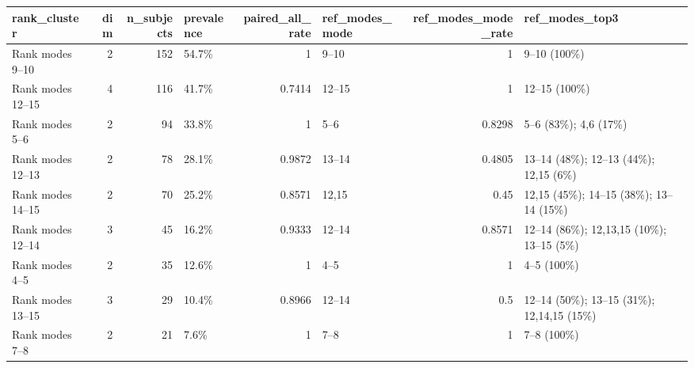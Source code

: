 \begin{tabular}{lrrlrlrl}
\toprule
rank\_cluster & dim & n\_subjects & prevalence & paired\_all\_rate & ref\_modes\_mode & ref\_modes\_mode\_rate & ref\_modes\_top3 \\
\midrule
Rank modes 9--10 & 2 & 152 & 54.7\% & 1 & 9--10 & 1 & 9--10 (100\%) \\
Rank modes 12--15 & 4 & 116 & 41.7\% & 0.7414 & 12--15 & 1 & 12--15 (100\%) \\
Rank modes 5--6 & 2 & 94 & 33.8\% & 1 & 5--6 & 0.8298 & 5--6 (83\%); 4,6 (17\%) \\
Rank modes 12--13 & 2 & 78 & 28.1\% & 0.9872 & 13--14 & 0.4805 & 13--14 (48\%); 12--13 (44\%); 12,15 (6\%) \\
Rank modes 14--15 & 2 & 70 & 25.2\% & 0.8571 & 12,15 & 0.45 & 12,15 (45\%); 14--15 (38\%); 13--14 (15\%) \\
Rank modes 12--14 & 3 & 45 & 16.2\% & 0.9333 & 12--14 & 0.8571 & 12--14 (86\%); 12,13,15 (10\%); 13--15 (5\%) \\
Rank modes 4--5 & 2 & 35 & 12.6\% & 1 & 4--5 & 1 & 4--5 (100\%) \\
Rank modes 13--15 & 3 & 29 & 10.4\% & 0.8966 & 12--14 & 0.5 & 12--14 (50\%); 13--15 (31\%); 12,14,15 (15\%) \\
Rank modes 7--8 & 2 & 21 & 7.6\% & 1 & 7--8 & 1 & 7--8 (100\%) \\
\bottomrule
\end{tabular}

